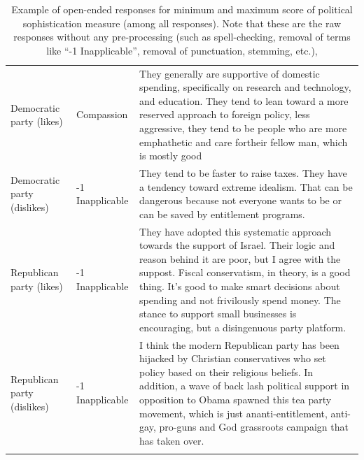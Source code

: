 \documentclass[12pt]{article}
\begin{document}
\begin{longtable}[ht]{p{1.4cm}lp{12cm}}
  Democratic party (likes) & Compassion & They generally are supportive of domestic spending, specifically on research and technology, and education. They tend to lean toward a more reserved approach to foreign policy, less aggressive, they tend to be people who are more emphathetic and care fortheir fellow man, which is mostly good \\ 
  Democratic party (dislikes) & -1 Inapplicable & They tend to be faster to raise taxes. They have a tendency toward extreme idealism.  That can be dangerous because not everyone wants to be or can be saved by entitlement programs. \\ 
  Republican party (likes) & -1 Inapplicable & They have adopted this systematic approach towards the support of Israel. Their logic and reason behind it are poor, but I agree with the suppost. Fiscal conservatism, in theory, is a good thing. It's good to make smart decisions about spending and not frivilously spend money.  The stance to support small businesses is encouraging, but a disingenuous party platform. \\ 
  Republican party (dislikes) & -1 Inapplicable & I think the modern Republican party has been hijacked by Christian conservatives who set policy based on their religious beliefs.  In addition, a wave of back lash political support in opposition to Obama spawned this tea party movement, which is just ananti-entitlement, anti-gay, pro-guns and God grassroots campaign that has taken over. \\ 
   \hline
   \caption{Example of open-ended responses for minimum and maximum score of political sophistication measure (among all responses). Note that these are the raw responses without any pre-processing (such as spell-checking, removal of terms like ``-1 Inapplicable'', removal of punctuation, stemming, etc.),}
\end{longtable}
\end{document}
